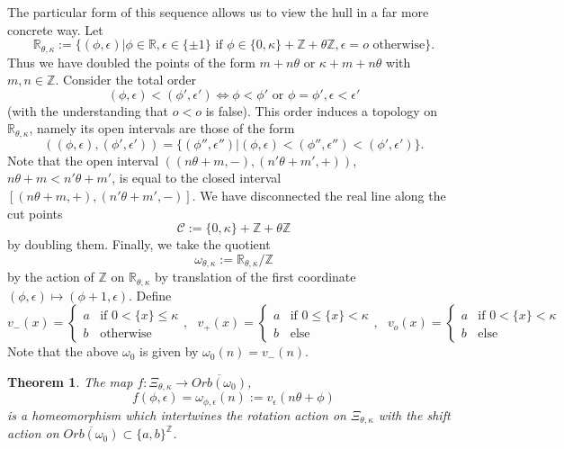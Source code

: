 \documentclass[11pt]{amsart}
\newtheorem{theorem}{Theorem}[section]\newcommand{\bigzero}{\mbox{\normalfont\Large\bfseries 0}}
\newcommand{\R}{\mathbb{R}}
\newcommand{\Z}{\mathbb{Z}}
\newcommand{\cut}{\kappa}
\begin{document}
The particular form of this sequence allows us to view the hull in a far more concrete way. Let
\begin{equation*}\label{cut_up_circle}
	\R_{\theta, \cut}:=\{(\phi,\epsilon) | \phi\in \R,\epsilon \in \{\pm 1\}\mbox{ if }\phi\in
	\{0,\cut\}+\Z+\theta\Z, 
	\epsilon = o \mbox{ otherwise}\}. 
\end{equation*}
Thus we have doubled the points of the form $m+n\theta$ or $\cut+m+n\theta$ with $m,n\in\Z$.   
Consider the total order 
$$  (\phi,\epsilon) < (\phi',\epsilon') \Leftrightarrow \phi < \phi' \mbox{ or } 
\phi = \phi', \epsilon <\epsilon ' $$
(with the understanding that $o<o$ is false). This order induces a topology on $\R_{\theta, \cut}$, namely its open intervals are those of the form
$$((\phi,\epsilon) , (\phi',\epsilon'))   = \{(\phi'',\epsilon'' )| (\phi,\epsilon) < (\phi'',\epsilon'')  < (\phi',\epsilon')\}.$$
Note that the open interval 
$((n\theta+m,-),(n'\theta+m',+))$, $n\theta+m<n'\theta+m'$, is equal to the closed interval $[(n\theta+m,+),(n'\theta+m',-)]$. 
We have disconnected the real line along the cut points $$\mathcal C:=\{0,\cut\}+\Z+\theta\Z$$ by doubling them. Finally, we take the quotient
\begin{equation}\label{eq-hull}
\omega_{\theta, \cut} :=\R_{\theta, \cut}/\Z
\end{equation}
by the action of $\Z$ on $\R_{\theta, \cut}$ by translation of the first coordinate $(\phi,\epsilon)\mapsto (\phi+1,\epsilon)$. 
Define
$$v_-(x) = \left\{\begin{array}{ll}
	a & \mbox{if } 0 < \{x\} \leq \cut \\
	b & \mbox{otherwise} \end{array}
\right.\!\!\!\!\!,\:\:\:
v_+(x) = \left\{\begin{array}{ll}
	a & \mbox{if } 0 \leq \{x\} < \cut \\
	b & \mbox{else} \end{array}
\right.\!\!\!\!\!,\:\:\:
v_o(x) = \left\{\begin{array}{ll}
	a & \mbox{if } 0<\{x\} < \cut \\
	b & \mbox{else} \end{array}
\right.$$
Note that the above $\omega_0$ is given by $\omega_0(n)=v_-(n)$.
\begin{theorem}  
	The map $f:\Xi_{\theta, \cut}\to \overline{Orb(\omega_0)}$, 
	$$ f(\phi,\epsilon)=\omega_{\phi,\epsilon}(n) := v_\epsilon(n\theta + \phi)$$
	is a homeomorphism which intertwines the rotation action on $\Xi_{\theta, \cut}$ with the shift action on $\overline{Orb(\omega_0)}\subset \{a,b\}^\Z$.
\end{theorem}
\end{document}
